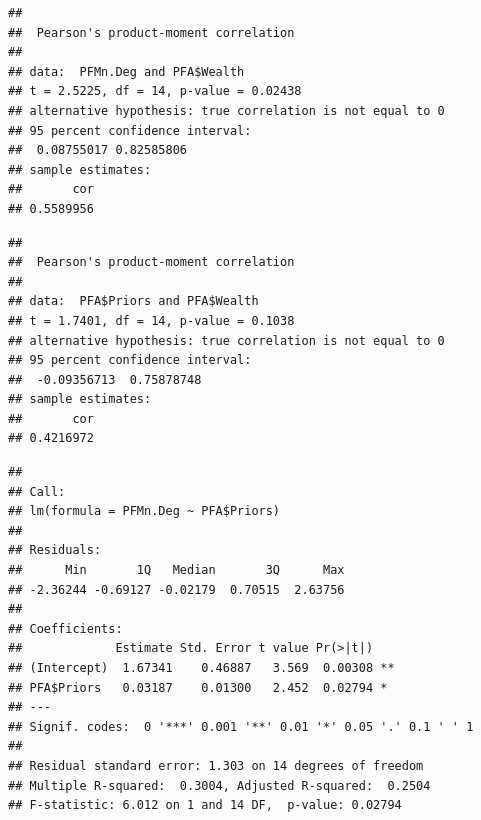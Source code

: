 \documentclass[
  notitlepage,
  onecolumn,
  openany]{book}
\newenvironment{Shaded}{\begin{snugshade}}{\end{snugshade}}
\newcommand{\CommentTok}[1]{\textcolor[rgb]{0.56,0.35,0.01}{\textit{#1}}}
\newcommand{\DocumentationTok}[1]{\textcolor[rgb]{0.56,0.35,0.01}{\textbf{\textit{#1}}}}
\newcommand{\FunctionTok}[1]{\textcolor[rgb]{0.00,0.00,0.00}{#1}}
\newcommand{\NormalTok}[1]{#1}
\newcommand{\OtherTok}[1]{\textcolor[rgb]{0.56,0.35,0.01}{#1}}
\newcommand{\SpecialCharTok}[1]{\textcolor[rgb]{0.00,0.00,0.00}{#1}}
\begin{document}
\begin{verbatim}
## 
##  Pearson's product-moment correlation
## 
## data:  PFMn.Deg and PFA$Wealth
## t = 2.5225, df = 14, p-value = 0.02438
## alternative hypothesis: true correlation is not equal to 0
## 95 percent confidence interval:
##  0.08755017 0.82585806
## sample estimates:
##       cor 
## 0.5589956
\end{verbatim}

\begin{Shaded}
\end{Shaded}

\begin{verbatim}
## 
##  Pearson's product-moment correlation
## 
## data:  PFA$Priors and PFA$Wealth
## t = 1.7401, df = 14, p-value = 0.1038
## alternative hypothesis: true correlation is not equal to 0
## 95 percent confidence interval:
##  -0.09356713  0.75878748
## sample estimates:
##       cor 
## 0.4216972
\end{verbatim}

\begin{Shaded}
\end{Shaded}

\begin{verbatim}
## 
## Call:
## lm(formula = PFMn.Deg ~ PFA$Priors)
## 
## Residuals:
##      Min       1Q   Median       3Q      Max 
## -2.36244 -0.69127 -0.02179  0.70515  2.63756 
## 
## Coefficients:
##             Estimate Std. Error t value Pr(>|t|)   
## (Intercept)  1.67341    0.46887   3.569  0.00308 **
## PFA$Priors   0.03187    0.01300   2.452  0.02794 * 
## ---
## Signif. codes:  0 '***' 0.001 '**' 0.01 '*' 0.05 '.' 0.1 ' ' 1
## 
## Residual standard error: 1.303 on 14 degrees of freedom
## Multiple R-squared:  0.3004, Adjusted R-squared:  0.2504 
## F-statistic: 6.012 on 1 and 14 DF,  p-value: 0.02794
\end{verbatim}
\end{document}
